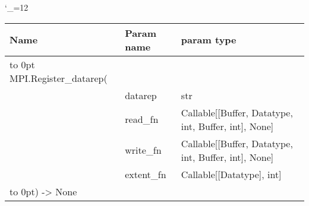\begingroup \catcode`\_=12 \tt
\begin{tabular}{lll}
\toprule
\textrm{Name}&\textrm{Param name}&\textrm{param type}\\
\midrule
\hbox to 0pt {MPI.Register_datarep(\hss}\\
& datarep & str\\
& read_fn & Callable[[Buffer, Datatype, int, Buffer, int], None]\\
& write_fn & Callable[[Buffer, Datatype, int, Buffer, int], None]\\
& extent_fn & Callable[[Datatype], int]\\
\hbox to 0pt{) -> None\hss}\\
\bottomrule
\end{tabular}
\endgroup
